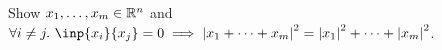 \documentclass{article}
\begin{document}
\begin{problem}
Show $x_1,\ldots,x_m\in \mathbb{R}^n$ and $\forall i\neq j.\  \inp{x_{i}}{x_{j}}=0  \implies {|x_1+\cdots+x_{m}|}^2={|x_1|}^2+\cdots+{|x_m|}^2$.
\end{problem}
\end{document}
